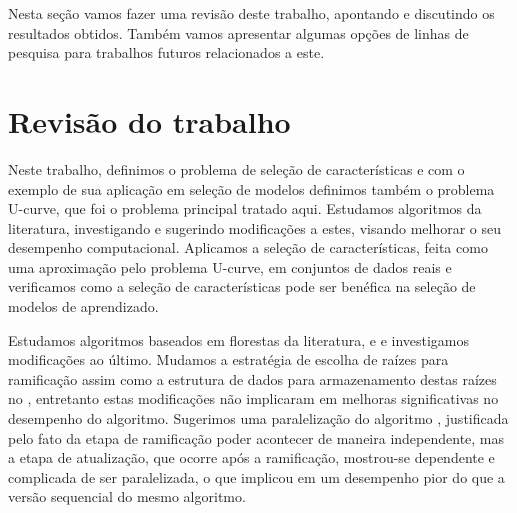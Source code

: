 Nesta seção vamos fazer uma revisão deste trabalho, apontando e 
discutindo os resultados obtidos. Também vamos apresentar algumas opções
de linhas de pesquisa para trabalhos futuros relacionados a este.
\section{Revisão do trabalho}

Neste trabalho, definimos o problema de seleção de características
e com o exemplo de sua aplicação em seleção de modelos definimos também
o problema U-curve, que foi o problema principal tratado aqui. Estudamos
algoritmos da literatura, investigando e sugerindo modificações a estes,
visando melhorar o seu desempenho computacional. Aplicamos a seleção de
características, feita como uma aproximação pelo problema U-curve, em
conjuntos de dados reais e verificamos como a seleção de características
pode ser benéfica na seleção de modelos de aprendizado.

Estudamos algoritmos baseados em florestas da literatura, 
e  e investigamos modificações ao último. Mudamos a 
estratégia de escolha de raízes para ramificação assim como a estrutura
de dados para armazenamento destas raízes no , entretanto
estas modificações não implicaram em melhoras significativas no 
desempenho do algoritmo. Sugerimos uma paralelização do algoritmo
, justificada pelo fato da etapa de ramificação poder 
acontecer de maneira independente, mas a etapa de atualização, que 
ocorre após a ramificação, mostrou-se dependente e complicada de ser
paralelizada, o que implicou em um desempenho pior do que a versão
sequencial do mesmo algoritmo. 

